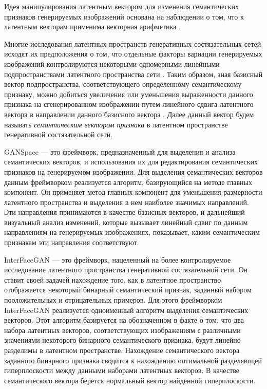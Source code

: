 Идея манипулирования латентным вектором для изменения семантических признаков генерируемых изображений основана на наблюдении о том, что к латентным векторам применима векторная арифметика \cite{radford2015unsupervised}.

Многие исследования латентных пространств генеративных состязательных сетей исходят их предположения о том, что отдельные факторы вариации генерируемых изображений контролируются некоторыми одномерными линейными подпространствами латентного пространства сети \cite{StyleGAN}.
Таким образом, зная базисный вектор подпространства, соответствующего определенному семантическому признаку, можно добиться увеличения или уменьшения выраженности данного признака на сгенерированном изображении путем линейного сдвига латентного вектора в направлении данного базисного вектора \cite{abdal2019image2stylegan}. 
Далее данный вектор будем называть \emph{семантическим вектором признака} в латентном пространстве генеративной состязательной сети.

GANSpace \cite{hrknen2020ganspace} --- это фреймворк, предназначенный для выделения и анализа семантических векторов, и использования их для редактирования семантических признаков на генерируемом изображении.
Для выделения семантических векторов данным фреймворком реализуется алгоритм, базирующийся на методе главных компонент.
Он применяет метод главных компонент для уменьшения размерности латентного пространства и выделения в нем наиболее значимых направлений. Эти направления принимаются в качестве базисных векторов, и дальнейший визуальный анализ изменений, которые вызывает линейный сдвиг по данным направлениям на генерируемых изображениях, показывает, каким семантическим признакам эти направления соответствуют.

InterFaceGAN \cite{shen2020interfacegan} --- это фреймворк, нацеленный на более контролируемое исследование латентного пространства генеративной состязательной сети.
Он ставит своей задачей нахождение того, как в латентное пространство отображается некоторый бинарный семантический признак, заданный набором пооложительных и отрицательных примеров.
Для этого фреймворком InterFaceGAN реализуется одноименный алгоритм выделения семантических векторов.
Этот алгоритм базируется на обозначенном в \cite{StyleGAN} факте о том, что два набора латентных векторов, соответствующих изображениям с различными значениями некоторого бинарного семантического признака, будут линейно разделимы в латентном пространстве.
Нахождение семантического вектора заданного бинарного признака сводится к нахождению оптимальной разделяющей гиперплоскости между данными наборами латентных векторов.
В качестве семантического вектора берется нормальный вектор найденной гиперплоскости.
